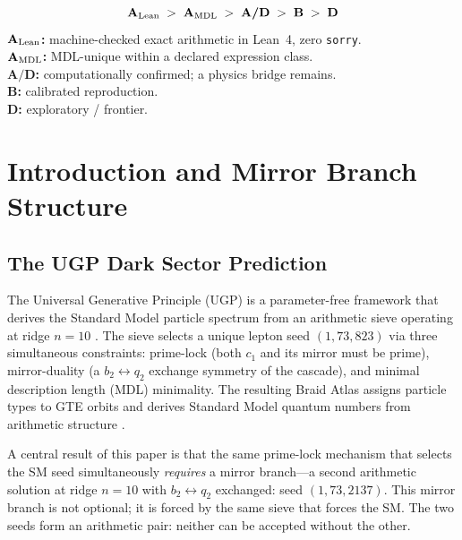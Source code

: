 \documentclass[11pt]{article}
\newcommand{\CatAL}{\ensuremath{\textbf{A}_{\rm Lean}}}
\newcommand{\CatAMDL}{\ensuremath{\textbf{A}_{\rm MDL}}}
\newcommand{\CatAD}{\textbf{A/D}}
\newcommand{\CatB}{\textbf{B}}
\newcommand{\CatD}{\textbf{D}}
\begin{document}
\begin{tcolorbox}[colback=gray!4,colframe=gray!50!black,
  title={\textbf{Claim-strength taxonomy}},
  fonttitle=\bfseries,left=6pt,right=6pt,top=5pt,bottom=5pt]
\small
\[
\CatAL \;>\; \CatAMDL \;>\; \CatAD \;>\; \CatB \;>\; \CatD
\]
\textbf{$\CatAL$:} machine-checked exact arithmetic in Lean~4, zero \texttt{sorry}.\\
\textbf{$\CatAMDL$:} MDL-unique within a declared expression class.\\
\textbf{$\CatAD$:} computationally confirmed; a physics bridge remains.\\
\textbf{$\CatB$:} calibrated reproduction.\\
\textbf{$\CatD$:} exploratory / frontier.
\end{tcolorbox}

\section{Introduction and Mirror Branch Structure}
\label{sec:intro}

\subsection{The UGP Dark Sector Prediction}
\label{ssec:dark_sector_prediction}

The Universal Generative Principle (UGP) is a parameter-free framework that derives the
Standard Model particle spectrum from an arithmetic sieve operating at ridge $n=10$
\cite{SpivackUGPSurvey,Spivack2025_FirstPrinciplesSM}. The sieve selects a unique lepton seed
$(1, 73, 823)$ via three simultaneous constraints: prime-lock (both $c_1$ and its
mirror must be prime), mirror-duality (a $b_2 \leftrightarrow q_2$ exchange symmetry of
the cascade), and minimal description length (MDL) minimality. The resulting Braid Atlas
assigns particle types to GTE orbits and derives Standard Model quantum numbers from
arithmetic structure \cite{SpivackBraidAtlas}.

A central result of this paper is that the same prime-lock mechanism that selects the SM
seed simultaneously \emph{requires} a mirror branch---a second arithmetic solution at
ridge $n=10$ with $b_2 \leftrightarrow q_2$ exchanged: seed $(1, 73, 2137)$. This mirror
branch is not optional; it is forced by the same sieve that forces the SM. The two
seeds form an arithmetic pair: neither can be accepted without the other.
\end{document}
